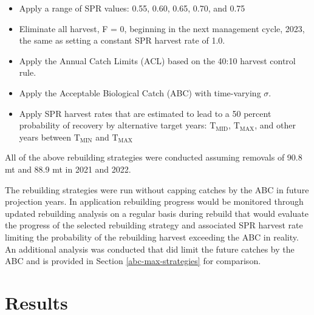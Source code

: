 \documentclass[11pt,
  english,
  a4paper,
]{article}
\begin{document}
\leavevmode\tagmcend\tagstructend\par

\begin{itemize}
    \item Apply a range of SPR values: 0.55, 0.60, 0.65, 0.70, and 0.75 
    \item Eliminate all harvest, F = 0, beginning in the next management cycle, 2023, the same as setting a constant SPR harvest rate of 1.0.
    \item Apply the Annual Catch Limits (ACL) based on the 40:10 harvest control rule.
    \item Apply the Acceptable Biological Catch (ABC) with time-varying $\sigma$.
    \item Apply SPR harvest rates that are estimated to lead to a 50 percent probability of recovery by alternative target years: $\text{T}_\text{MID}$, $\text{T}_\text{MAX}$, and other years between $\text{T}_\text{MIN}$ and $\text{T}_\text{MAX}$
\end{itemize}


All of the above rebuilding strategies were conducted assuming removals of 90.8 mt and 88.9 mt in 2021 and 2022.

\leavevmode\tagmcend\tagstructend\par


The rebuilding strategies were run without capping catches by the ABC in future projection years. In application rebuilding progress would be monitored through updated rebuilding analysis on a regular basis during rebuild that would evaluate the progress of the selected rebuilding strategy and associated SPR harvest rate limiting the probability of the rebuilding harvest exceeding the ABC in reality. An additional analysis was conducted that did limit the future catches by the ABC and is provided in Section \ref{abc-max-strategies} for comparison.

\leavevmode\tagmcend\tagstructend\par


\hypertarget{results}{%
\section{Results}\label{results}}

\leavevmode\tagmcend\tagstructend
\end{document}
